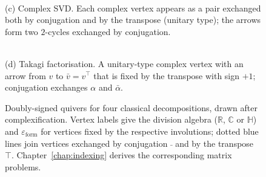 \documentclass[12pt, a4paper]{report}
\theoremstyle{plain}
\theoremstyle{definition}
\theoremstyle{remark}
\theoremstyle{plain}
\newcommand{\epsilonform}{\varepsilon_{\mathrm{form}}}
\newcommand{\RR}{\mathbb{R}}
\newcommand{\CC}{\mathbb{C}}
\newcommand{\HH}{\mathbb{H}}
\begin{document}
\begin{figure}[ht]
\vspace{5mm}
\begin{minipage}{0.47\linewidth}\centering
{}\\[1mm]
{\small (c) Complex SVD. Each complex vertex appears as a pair exchanged both by conjugation and by the transpose (unitary type); the arrows form two $2$-cycles exchanged by conjugation.}
\end{minipage}\hfill
\begin{minipage}{0.47\linewidth}\centering
{}\\[1mm]
{\small (d) Takagi factorisation. A unitary-type complex vertex with an arrow from $v$ to $\bar v=v^{\top}$ that is fixed by the transpose with sign $+1$; conjugation exchanges $\alpha$ and $\bar\alpha$.}
\end{minipage}
\caption{Doubly-signed quivers for four classical decompositions, drawn after complexification. Vertex labels give the division algebra ($\RR$, $\CC$ or $\HH$) and $\epsilonform$ for vertices fixed by the respective involutions; dotted blue lines join vertices exchanged by conjugation $\bar{\ }$ and by the transpose $\top$. Chapter~\ref{chap:indexing} derives the corresponding matrix problems.}
\label{fig:dsq-examples}
\end{figure}
\end{document}
